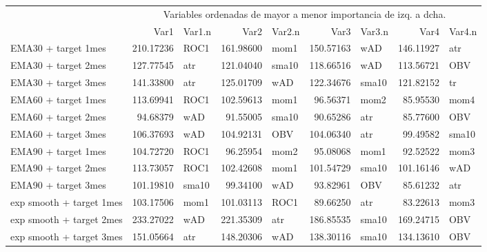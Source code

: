 \documentclass[]{DissertateUSU}
\begin{document}
\begin{table}[H]
\centering\begingroup\fontsize{10}{12}\selectfont

\begin{tabular}{l|r|l|r|l|r|l|r|l}
\hline
\multicolumn{1}{c|}{ } & \multicolumn{8}{c}{Variables ordenadas de mayor a menor importancia de izq. a dcha.} \\
\cline{2-9}
  & Var1 & Var1.n & Var2 & Var2.n & Var3 & Var3.n & Var4 & Var4.n\\
\hline
EMA30 + target 1mes & 210.17236 & ROC1 & 161.98600 & mom1 & 150.57163 & wAD & 146.11927 & atr\\
\hline
EMA30 + target 2mes & 127.77545 & atr & 121.04040 & sma10 & 118.66516 & wAD & 113.56721 & OBV\\
\hline
EMA30 + target 3mes & 141.33800 & atr & 125.01709 & wAD & 122.34676 & sma10 & 121.82152 & tr\\
\hline
EMA60 + target 1mes & 113.69941 & ROC1 & 102.59613 & mom1 & 96.56371 & mom2 & 85.95530 & mom4\\
\hline
EMA60 + target 2mes & 94.68379 & wAD & 91.55005 & sma10 & 90.65286 & atr & 85.77600 & OBV\\
\hline
EMA60 + target 3mes & 106.37693 & wAD & 104.92131 & OBV & 104.06340 & atr & 99.49582 & sma10\\
\hline
EMA90 + target 1mes & 104.72720 & ROC1 & 96.25954 & mom2 & 95.08068 & mom1 & 92.52522 & mom3\\
\hline
EMA90 + target 2mes & 113.73057 & ROC1 & 102.42608 & mom1 & 101.54729 & sma10 & 101.16146 & wAD\\
\hline
EMA90 + target 3mes & 101.19810 & sma10 & 99.34100 & wAD & 93.82961 & OBV & 85.61232 & atr\\
\hline
exp smooth + target 1mes & 103.17506 & mom1 & 101.03113 & ROC1 & 89.66250 & atr & 83.22613 & mom3\\
\hline
exp smooth + target 2mes & 233.27022 & wAD & 221.35309 & atr & 186.85535 & sma10 & 169.24715 & OBV\\
\hline
exp smooth + target 3mes & 151.05664 & atr & 148.20306 & wAD & 138.30116 & sma10 & 134.13610 & OBV\\
\hline
\end{tabular}
\endgroup{}
\end{table}

\setlength\parskip{5ex}
\end{document}
